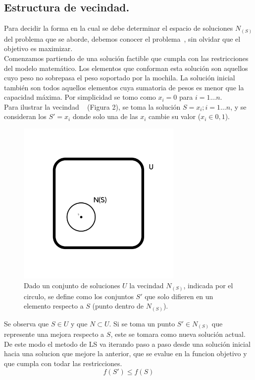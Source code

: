 \documentclass{ci5652}
\begin{document}
	\subsection{Estructura de vecindad.}
	Para decidir la forma en la cual se debe determinar el espacio de soluciones $N_{(S)}$ del problema que se aborde, debemos conocer el problema~\cite{c_KP_02}, sin olvidar que el objetivo es maximizar.\\
	Comenzamos partiendo de una solución factible que cumpla con las restricciones del modelo matemático. Los elementos que conforman esta solución son aquellos cuyo peso no sobrepasa el peso soportado por la mochila. La solución inicial también son todos aquellos elementos cuya sumatoria de pesos es menor que la capacidad máxima. Por simplicidad se tomo como $x_i = 0$ para $i = 1\ldots n$.\\
	Para ilustrar la vecindad ~\cite{c_KP_03} (Figura 2), se toma la solución $S = {x_i};i =1\ldots n$, y se consideran los $S'={x_i}$ donde solo una de las $x_i$ cambie su valor ($x_i \in {0,1}$).

 	\begin{figure}[h]
 	\caption{Dado un conjunto de soluciones $U$ la vecindad $N_{(S)}$, indicada por el circulo, se define como los conjuntos $S'$ que solo difieren en un elemento respecto a $S$ (punto dentro de $N_{(S)}$).}
	\includegraphics[width=8cm, height=8cm]{Vecindad.png}
	\end{figure}

	Se observa que $S \in U$ y que $N \subset U$. Si se toma un punto $S' \in N_{(S)}$ que represente una mejora respecto a $S$, este se tomara como nueva solución actual. De este modo el metodo de LS va iterando paso a paso desde una solución inicial hacia una solucion que mejore la anterior, que se evalue en la funcion objetivo y que cumpla con todar las restricciones.
	$$
	f(S') \leq f(S)
	$$
\end{document}
